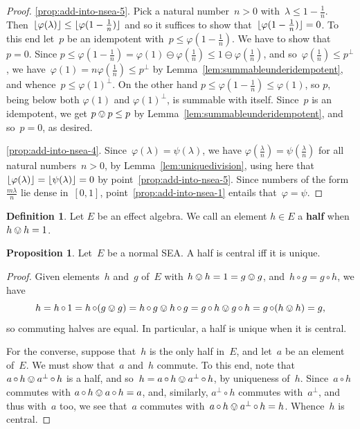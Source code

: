 \documentclass[a4paper, onecolumn, accepted=2020-12-22]{quantumarticle}
\DeclarePairedDelimiter{\floor}{\lfloor}{\rfloor}
\newcommand\Define[1]{\textbf{#1}}
\newcommand{\mult}{\mathop{\circ}}
\newcounter{counter}
\theoremstyle{definition}
\newtheorem{proposition}[counter]{Proposition}
\newtheorem{definition}[counter]{Definition}
\begin{document}
\begin{proof}
\ref{prop:add-into-nsea-5}.
Pick a natural number~$n >0$ with~$\lambda \leq 1 - \frac{1}{n}$.
Then~$\floor{\varphi(\lambda)} \leq \floor{\varphi(1 - \frac{1}{n})}$
    and so it suffices to show that~$\floor{\varphi(1-\frac{1}{n})}=0$.
To this end let~$p$ be an idempotent with~$p \leq \varphi(1 - \frac{1}{n})$.
We have to show that~$p=0$.
Since $p\leq \varphi(1-\frac{1}{n})=\varphi(1)\ominus \varphi(\frac{1}{n})
\leq 1\ominus \varphi(\frac{1}{n})$,
and so~$\varphi(\frac{1}{n})\leq p^\perp$,
we have~$\varphi(1) = n\varphi(\frac{1}{n})\leq p^\perp$
by Lemma~\ref{lem:summableunderidempotent},
and whence~$p\leq \varphi(1)^\perp$.
On the other hand $p\leq \varphi(1-\frac{1}{n})\leq \varphi(1)$,
so $p$, being below both $\varphi(1)$ and $\varphi(1)^\perp$,
is summable with itself.  
Since~$p$ is an idempotent,
we get $p\ovee p\leq p$ by Lemma~\ref{lem:summableunderidempotent},
and so~$p=0$, as desired.

\ref{prop:add-into-nsea-4}.
Since~$\varphi(\lambda)=\psi(\lambda)$,
we have $\varphi(\frac{\lambda}{n})=\psi(\frac{\lambda}{n})$
for all natural numbers~$n>0$,
by Lemma~\ref{lem:uniquedivision},
using here that~$\floor{\varphi(\lambda)} = \floor{\psi(\lambda)}=0$
by point~\ref{prop:add-into-nsea-5}.
Since numbers of the form~$\frac{m\lambda}{n}$
lie dense in~$[0,1]$,
point~\ref{prop:add-into-nsea-1}
entails that~$\varphi=\psi$.
\end{proof}

\begin{definition}
    Let $E$ be an effect algebra. We call an element $h\in E$ a \Define{half} when $h\ovee h = 1$.
\end{definition}
\begin{proposition}\label{prophalvecentral}
Let~$E$ be a normal SEA.
A half is central iff it is unique.
\end{proposition}
\begin{proof}
Given elements~$h$ and~$g$  of~$E$
with $h\ovee h=1=g\ovee g$,
and~$h\mult g = g\mult h$,
we have
\[h=h\mult 1
  = h\mult (g\ovee g)
  = h\mult g\ovee h\mult g
  = g\mult h\ovee g\mult h
  = g\mult(h\ovee h) = g,\]
so commuting halves are equal.
In particular,
a half is unique when it is central.

For the converse,
suppose that~$h$ is the only half in~$E$,
and let~$a$ be an element of~$E$.
We must show that~$a$ and~$h$ commute.
To this end,
note that~$a \mult h \ovee a^\perp \mult h$
is a half,
and so~$h=a\mult h\ovee a^\perp\mult h$,
 by uniqueness of~$h$.
Since~$a\mult h$ commutes with $a\mult h \ovee a\mult h =  a$,
and, similarly, $a^\perp \mult h$ commutes with~$a^\perp$,
and thus with~$a$ too, 
  we see that~$a$ commutes with~$a\mult h\ovee a^\perp \mult h = h$.
Whence~$h$ is central.
\end{proof}
\end{document}
